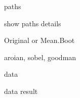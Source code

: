 \documentclass[a4paper]{book}
\begin{document}
%
\begin{Arguments}
\begin{ldescription}
\item[\code{...}] paths

\item[\code{show}] show paths details

\item[\code{est}] Original or Mean.Boot

\item[\code{sobel}] aroian, sobel, goodman

\item[\code{bootdataboot}] data
\end{ldescription}
\end{Arguments}
%
\begin{Value}
data result
\end{Value}
%
\end{document}
